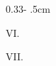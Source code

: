 \documentclass[portrait]{utils_poster}
\begin{document}
\begin{columns}[onlytextwidth]
\begin{column}{0.33\textwidth - .5cm}
\begin{block}{VI. }
    \end{block}

    \vspace{.15cm}

    \begin{block}{VII. }
        \renewcommand*{\bibfont}{\normalfont\fontsize{20}{12}\selectfont}
        \color{uiored}
        \vspace{.8cm}
    
    \end{block}
\end{column}


\end{columns}
\end{document}
